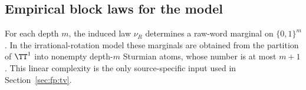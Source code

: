 \subsection{Empirical block laws for the model}\label{sec:readout:empirical}

For each depth $m$, the induced law $\nu_R$ determines a raw-word marginal on $\{0,1\}^m$. In the irrational-rotation model these marginals are obtained from the partition of $\TT^1$ into nonempty depth-$m$ Sturmian atoms, whose number is at most $m+1$. This linear complexity is the only source-specific input used in Section~\ref{sec:fp:tv}.

